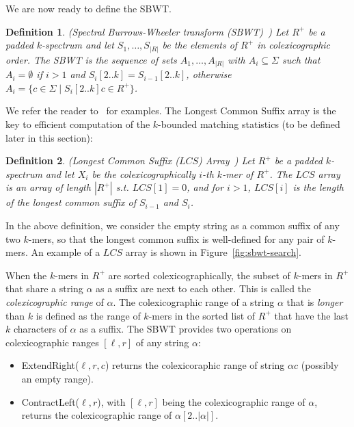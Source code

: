\documentclass[unnumsec,webpdf,contemporary,large]{oup-authoring-template}%
\theoremstyle{thmstyleone}%
\theoremstyle{thmstyletwo}%
\theoremstyle{thmstylethree}%
\newtheorem{definition}{Definition}
\begin{document}
We are now ready to define the SBWT.

\begin{definition}\label{def:SBWT}(Spectral Burrows-Wheeler transform (SBWT)~\cite{alanko2023small}) Let $R^+$ be a padded $k$-spectrum and let $S_1, \ldots, S_{|R|}$ be the elements of $R^+$ in colexicographic order. The SBWT is the sequence of sets $A_1, \ldots, A_{|R|}$ with $A_i \subseteq \Sigma$ such that $A_i = \emptyset$ if $i > 1$ and $S_i[2..k] = S_{i-1}[2..k]$, otherwise $A_i = \{c \in \Sigma \; | \; S_i[2..k]c \in R^+\}$.
\end{definition}
\noindent We refer the reader to~\cite{alanko2023longest, alanko2024finimizers, alanko2023small} for examples. The Longest Common Suffix array is the key to efficient computation of the $k$-bounded matching statistics (to be defined later in this section):

\begin{definition}\label{def:LCS-array}(Longest Common Suffix ($LCS$) Array~\cite{alanko2023longest})     
Let $R^+$ be a padded $k$-spectrum and let $X_i$ be the colexicographically $i$-th $k$-mer of $R^+$. 
The $LCS$ array is an array of length $|R^+|$ s.t. $LCS[1] = 0$, and for $i > 1$, $LCS[i]$ is the length of the longest common suffix of $S_{i-1}$ and $S_i$.
\end{definition}
 In the above definition, we consider the empty string as a common suffix of any two $k$-mers, so that the longest common suffix is well-defined for any pair of $k$-mers.
An example of a $LCS$ array is shown in Figure~\ref{fig:sbwt-search}.

When the $k$-mers in $R^+$ are sorted colexicographically, the subset of $k$-mers in $R^+$ that share a string $\alpha$ as a suffix are next to each other. This is called the \emph{colexicographic range} of $\alpha$. The colexicographic range of a string $\alpha$ that is \emph{longer} than $k$ is defined as the range of $k$-mers in the sorted list of $R^+$ that have the last $k$ characters of $\alpha$ as a suffix. The SBWT provides two operations on colexicographic ranges $[\ell, r]$ of any string $\alpha$: 

\begin{itemize}
\item ExtendRight($\ell, r, c$) returns the colexicoraphic range of string $\alpha c$ (possibly an empty range).
\item ContractLeft($\ell, r$), with $[\ell, r]$ being the colexicographic range of $\alpha$, returns the colexicographic range of $\alpha[2..|\alpha|]$.
\end{itemize}
\end{document}
